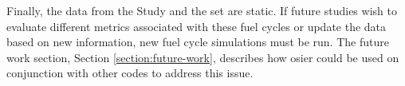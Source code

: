 Finally, the data from the Study and the \ac{set} are static. If future studies wish to evaluate different metrics
associated with these fuel cycles or update the data based on new information, new fuel cycle simulations must be run.
The future work section, Section \ref{section:future-work}, describes how \ac{osier} could be used on conjunction
with other codes to address this issue. 
